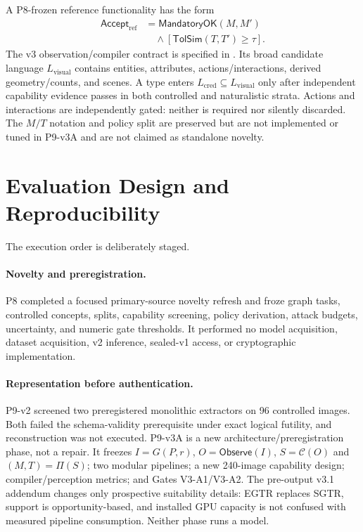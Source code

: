 \documentclass[compsoc,conference,a4paper,10pt,times]{IEEEtran}
\begin{document}
A P8-frozen reference functionality has the form
\begin{equation}
\begin{aligned}
  \mathsf{Accept}_{\mathrm{ref}} & = \mathsf{MandatoryOK}(M,M') \\
  & \quad\land [\mathsf{TolSim}(T,T')\geq\tau].
\end{aligned}
\end{equation}
The v3 observation/compiler contract is specified in . Its broad candidate language $L_{\mathrm{visual}}$ contains entities, attributes, actions/interactions, derived geometry/counts, and scenes. A type enters $L_{\mathrm{cred}}\subseteq L_{\mathrm{visual}}$ only after independent capability evidence passes in both controlled and naturalistic strata. Actions and interactions are independently gated: neither is required nor silently discarded. The $M/T$ notation and policy split are preserved but are not implemented or tuned in P9-v3A and are not claimed as standalone novelty.

\section{Evaluation Design and Reproducibility}
\label{sec:evaluation}
The execution order is deliberately staged.

\paragraph{Novelty and preregistration.} P8 completed a focused primary-source novelty refresh and froze graph tasks, controlled concepts, splits, capability screening, policy derivation, attack budgets, uncertainty, and numeric gate thresholds. It performed no model acquisition, dataset acquisition, v2 inference, sealed-v1 access, or cryptographic implementation.

\paragraph{Representation before authentication.} P9-v2 screened two preregistered monolithic extractors on 96 controlled images. Both failed the schema-validity prerequisite under exact logical futility, and reconstruction was not executed. P9-v3A is a new architecture/preregistration phase, not a repair. It freezes $I=G(P,r)$, $O=\mathsf{Observe}(I)$, $S=\mathcal{C}(O)$ and $(M,T)=\Pi(S)$; two modular pipelines; a new 240-image capability design; compiler/perception metrics; and Gates V3-A1/V3-A2. The pre-output v3.1 addendum changes only prospective suitability details: EGTR replaces SGTR, support is opportunity-based, and installed GPU capacity is not confused with measured pipeline consumption. Neither phase runs a model.
\end{document}
